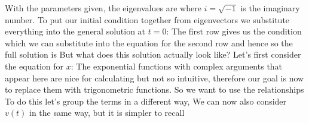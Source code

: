 \solution 
With the parameters given, the eigenvalues are 
where $i=\sqrt{-1}$ is the imaginary number. To put our initial condition together from eigenvectors we substitute everything into the general solution at $t=0$:
The first row gives us the condition 
which we can substitute into the equation for the second row
and hence
so the full solution is 
But what does this solution actually look like? Let's first consider the equation for $x$:
The exponential functions with complex arguments that appear here are nice for calculating but not so intuitive, therefore our goal is now to replace them with trigonometric functions. So we want to use the relationships
To do this let's group the terms in a different way, 
We can now also consider $v(t)$ in the same way, but it is simpler to recall

